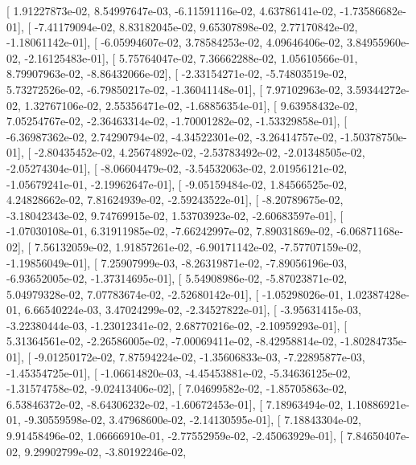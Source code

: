 \documentclass{article}
\begin{document}
       [  1.91227873e-02,   8.54997647e-03,  -6.11591116e-02,
          4.63786141e-02,  -1.73586682e-01],
       [ -7.41179094e-02,   8.83182045e-02,   9.65307898e-02,
          2.77170842e-02,  -1.18061142e-01],
       [ -6.05994607e-02,   3.78584253e-02,   4.09646406e-02,
          3.84955960e-02,  -2.16125483e-01],
       [  5.75764047e-02,   7.36662288e-02,   1.05610566e-01,
          8.79907963e-02,  -8.86432066e-02],
       [ -2.33154271e-02,  -5.74803519e-02,   5.73272526e-02,
         -6.79850217e-02,  -1.36041148e-01],
       [  7.97102963e-02,   3.59344272e-02,   1.32767106e-02,
          2.55356471e-02,  -1.68856354e-01],
       [  9.63958432e-02,   7.05254767e-02,  -2.36463314e-02,
         -1.70001282e-02,  -1.53329858e-01],
       [ -6.36987362e-02,   2.74290794e-02,  -4.34522301e-02,
         -3.26414757e-02,  -1.50378750e-01],
       [ -2.80435452e-02,   4.25674892e-02,  -2.53783492e-02,
         -2.01348505e-02,  -2.05274304e-01],
       [ -8.06604479e-02,  -3.54532063e-02,   2.01956121e-02,
         -1.05679241e-01,  -2.19962647e-01],
       [ -9.05159484e-02,   1.84566525e-02,   4.24828662e-02,
          7.81624939e-02,  -2.59243522e-01],
       [ -8.20789675e-02,  -3.18042343e-02,   9.74769915e-02,
          1.53703923e-02,  -2.60683597e-01],
       [ -1.07030108e-01,   6.31911985e-02,  -7.66242997e-02,
          7.89031869e-02,  -6.06871168e-02],
       [  7.56132059e-02,   1.91857261e-02,  -6.90171142e-02,
         -7.57707159e-02,  -1.19856049e-01],
       [  7.25907999e-03,  -8.26319871e-02,  -7.89056196e-03,
         -6.93652005e-02,  -1.37314695e-01],
       [  5.54908986e-02,  -5.87023871e-02,   5.04979328e-02,
          7.07783674e-02,  -2.52680142e-01],
       [ -1.05298026e-01,   1.02387428e-01,   6.66540224e-03,
          3.47024299e-02,  -2.34527822e-01],
       [ -3.95631415e-03,  -3.22380444e-03,  -1.23012341e-02,
          2.68770216e-02,  -2.10959293e-01],
       [  5.31364561e-02,  -2.26586005e-02,  -7.00069411e-02,
         -8.42958814e-02,  -1.80284735e-01],
       [ -9.01250172e-02,   7.87594224e-02,  -1.35606833e-03,
         -7.22895877e-03,  -1.45354725e-01],
       [ -1.06614820e-03,  -4.45453881e-02,  -5.34636125e-02,
         -1.31574758e-02,  -9.02413406e-02],
       [  7.04699582e-02,  -1.85705863e-02,   6.53846372e-02,
         -8.64306232e-02,  -1.60672453e-01],
       [  7.18963494e-02,   1.10886921e-01,  -9.30559598e-02,
          3.47968600e-02,  -2.14130595e-01],
       [  7.18843304e-02,   9.91458496e-02,   1.06666910e-01,
         -2.77552959e-02,  -2.45063929e-01],
       [  7.84650407e-02,   9.29902799e-02,  -3.80192246e-02,
\end{document}

